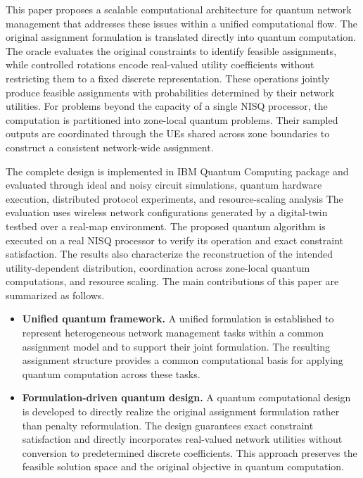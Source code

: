 \documentclass[journal]{IEEEtran}
\begin{document}
{{This paper proposes a scalable computational architecture for quantum network management that addresses these issues within a unified computational flow. The original assignment formulation is translated directly into quantum computation. The oracle evaluates the original constraints to identify feasible assignments, while controlled
rotations encode real-valued utility coefficients without restricting them to a fixed discrete representation. These operations jointly produce feasible assignments with probabilities determined by their network utilities. For problems beyond the capacity of a single NISQ processor, the computation is partitioned into zone-local quantum
problems. Their sampled outputs are coordinated through the UEs shared across zone boundaries to construct a consistent network-wide assignment.

The complete design is implemented in IBM Quantum Computing package and evaluated through ideal and noisy circuit simulations, quantum hardware execution, distributed protocol experiments, and resource-scaling analysis The evaluation uses wireless network configurations generated by a digital-twin testbed over a real-map environment. The proposed quantum algorithm is executed on a real NISQ processor to verify its operation and exact constraint satisfaction. The results also characterize the reconstruction of the intended utility-dependent distribution, coordination across zone-local quantum computations, and resource scaling. The main contributions of this paper are summarized as follows.

\begin{itemize}
\item \textbf{Unified quantum framework.}
A unified formulation is established to represent heterogeneous network management tasks within a common assignment model and to support their joint formulation. The resulting assignment structure provides a common computational basis for applying quantum computation across these tasks.

\item \textbf{Formulation-driven quantum design.}
A quantum computational design is developed to directly realize the original assignment formulation rather than  penalty reformulation. The design guarantees exact constraint satisfaction and directly incorporates real-valued network utilities without conversion to predetermined discrete coefficients. This approach preserves the feasible solution space and the original objective in quantum computation.


\end{itemize}}}
\end{document}

